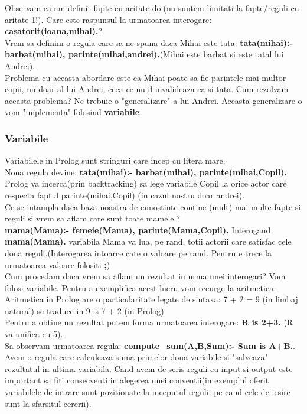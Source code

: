 Observam ca am definit fapte cu aritate doi(nu suntem limitati la fapte/reguli cu aritate 1!).
Care este raspunsul la urmatoarea interogare: \textbf{casatorit(ioana,mihai).}? \\
Vrem sa definim o regula care sa ne spuna daca Mihai este tata: \textbf{tata(mihai):- barbat(mihai), parinte(mihai,andrei).}(Mihai este barbat si este tatal lui Andrei).\\Problema cu aceasta abordare este ca Mihai poate sa fie parintele mai multor copii, nu doar al lui Andrei, ceea ce nu il invalideaza ca si tata. Cum rezolvam aceasta problema? Ne trebuie o "generalizare" a lui Andrei.
Aceasta generalizare o vom "implementa" folosind \textbf{variabile}. 
\subsubsection*{ Variabile }
Variabilele in Prolog sunt stringuri care incep cu litera mare.\\Noua regula devine: \textbf{tata(mihai):- barbat(mihai), parinte(mihai,Copil).}\\Prolog va incerca(prin backtracking) sa lege variabile Copil la orice actor care respecta faptul parinte(mihai,Copil) (in cazul nostru doar andrei). \\Ce se intampla daca baza noastra de cunostinte contine (mult) mai multe fapte si reguli si vrem sa aflam care sunt toate mamele.?\\\textbf{mama(Mama):- femeie(Mama), parinte(Mama,Copil).} Interogand \textbf{mama(Mama).} variabila Mama va lua, pe rand, totii actorii care satisfac cele doua reguli.(Interogarea intoarce cate o valoare pe rand. Pentru e trece la urmatoarea valoare folositi \textbf{;}) \\
Cum procedam daca vrem sa aflam un rezultat in urma unei interogari? Vom folosi variabile. Pentru a exemplifica acest lucru vom recurge la aritmetica.\\
Aritmetica in Prolog are o particularitate legate de sintaxa: 7 + 2 = 9 (in limbaj natural) se traduce in 9 is 7 + 2 (in Prolog). \\Pentru a obtine un rezultat putem forma urmatoarea interogare: \textbf{ R is 2+3.} (R va unifica cu 5). \\
Sa observam urmatoarea regula: \textbf{compute\_sum(A,B,Sum):- Sum is A+B.}. Avem o regula care calculeaza suma primelor doua variabile si "salveaza" rezultatul in ultima variabila. Cand avem de scris reguli cu input si output este important sa fiti consecventi in alegerea unei conventii(in exemplul oferit variabilele de intrare sunt pozitionate la inceputul regulii pe cand cele de iesire sunt la sfarsitul cererii).

